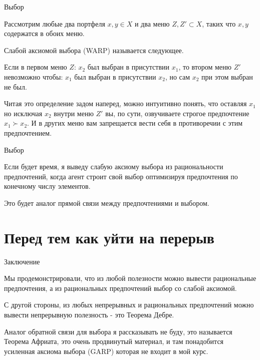 \documentclass{beamer}
\begin{document}
\begin{frame}{Выбор}

Рассмотрим любые два портфеля $x, y \in X$ и два меню $Z,Z' \subset X$, таких что $x,y$ содержатся в обоих меню.

\begin{definition} 
\alert{Слабой аксиомой выбора} (WARP) называется следующее. 

Если в первом меню $Z$: $x_2$ был выбран в присутствии $x_1$, то втором меню $Z'$ невозможно чтобы: $x_1$ был выбран в присутствии $x_2$, но сам $x_2$ при этом выбран не был.
\end{definition}

Читая это определение задом наперед, можно интуитивно понять, что оставляя $x_1$ но исключая $x_2$ внутри меню $Z'$ вы, по сути, озвучиваете строгое предпочтение $x_1 \succ x_2$. И в других меню вам запрещается вести себя в противоречии с этим предпочтением.

\end{frame}

\begin{frame}{Выбор}

Если будет время, я выведу слабую аксиому выбора из рациональности предпочтений, когда агент строит свой выбор оптимизируя предпочтения по конечному числу элементов. 

Это будет аналог прямой связи между предпочтениями и выбором.
%
%

\end{frame}

\section{Перед тем как уйти на перерыв}

\begin{frame}{Заключение}

Мы продемонстрировали, что из любой полезности можно вывести рациональные предпочтения, а из рациональных предпочтений выбор со слабой аксиомой.

С другой стороны, из любых непрерывных и рациональных предпочтений можно вывести непрерывную полезность - это Теорема Дебре.

Аналог обратной связи для выбора я рассказывать не буду, это называется \alert{Теорема Африата}, это очень продвинутый материал, и там понадобится усиленная аксиома выбора (GARP) которая не входит в мой курс. 

\end{frame}
\end{document}
